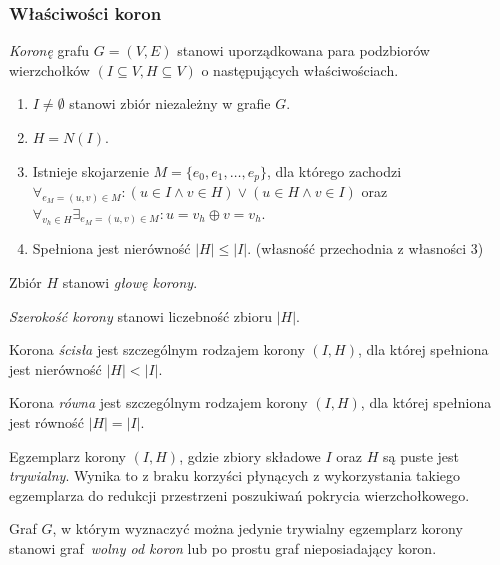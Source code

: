 \subsubsection{\textbf{Właściwości koron}}
\label{sss_kernelization_crown_main}
\begin{definition}
  \emph{Koronę} grafu $G=(V, E)$ stanowi uporządkowana para podzbiorów wierzchołków $(I \subseteq V, H \subseteq V)$ o następujących właściwościach.
  \begin{enumerate}
    \item $I \neq \emptyset$ stanowi zbiór niezależny w grafie $G$.
    \item $H=N(I)$.
    \item Istnieje skojarzenie $M=\{e_0, e_1, \ldots, e_p\}$, dla którego zachodzi $\forall_{e_M=(u,v) \in M}: (u\in I \land v\in H) \lor (u \in H \land v \in I)$ oraz $\forall_{v_h \in H}\exists_{e_M=(u,v)\in M}: u = v_h \oplus v = v_h$.
    \item Spełniona jest nierówność $|H| \leq |I|$. (własność przechodnia z własności 3)
  \end{enumerate}
\end{definition}
\begin{definition}
  Zbiór $H$ stanowi \emph{głowę korony}.
\end{definition}
\begin{definition}
  \emph{Szerokość korony} stanowi liczebność zbioru $|H|$.
\end{definition}
\begin{definition}
  Korona \emph{ścisła} jest szczególnym rodzajem korony $(I, H)$, dla której spełniona jest nierówność $|H| < |I|$.
\end{definition}
\begin{definition}
  Korona \emph{równa} jest szczególnym rodzajem korony $(I, H)$, dla której spełniona jest równość $|H| = |I|$.
\end{definition}
\begin{definition}
  Egzemplarz korony $(I, H)$, gdzie zbiory składowe $I$ oraz $H$ są puste jest \emph{trywialny}.
  Wynika to z braku korzyści płynących z wykorzystania takiego egzemplarza do redukcji przestrzeni poszukiwań pokrycia wierzchołkowego.
\end{definition}
\begin{definition}
  Graf $G$, w którym wyznaczyć można jedynie trywialny egzemplarz korony stanowi graf~\emph{wolny od koron} lub po prostu graf nieposiadający koron.
\end{definition}
